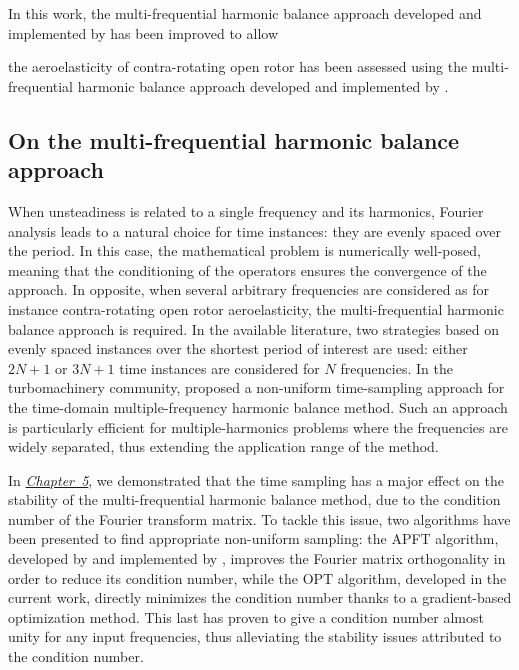 In this work, the multi-frequential
harmonic balance approach developed and implemented 
by \citet{ThesisGuedeney} has been improved
to allow

the aeroelasticity of 
contra-rotating open rotor has been assessed 
using the multi-frequential
harmonic balance approach developed and implemented 
by \citet{ThesisGuedeney}.

\subsection*{On the multi-frequential harmonic balance approach}

When unsteadiness is related to a single frequency and its
harmonics, Fourier analysis leads to a natural choice for time instances:
they are evenly spaced over the period. In this case, the mathematical
problem is numerically well-posed, meaning that the conditioning of
the operators ensures the convergence of the approach.
In opposite, when several arbitrary frequencies are 
considered as for instance contra-rotating open rotor
aeroelasticity, the multi-frequential harmonic balance approach
is required. In the available literature, two strategies based on evenly
spaced instances over the shortest period of interest are used: either
$2N+1$ or $3N+1$ time instances are considered for $N$ frequencies.
In the turbomachinery community, \citet{ThesisGuedeney} 
proposed a non-uniform time-sampling approach for
the time-domain multiple-frequency harmonic balance method. Such an
approach is particularly efficient for multiple-harmonics problems where
the frequencies are widely separated, thus extending the application range
of the method. 

In \hyperref[cha:limitations_condition_number]{\emph{Chapter~5}},
we demonstrated that the time sampling has a major effect on the
stability of the multi-frequential harmonic balance 
method, due to the condition number of the Fourier
transform matrix. To tackle this issue, two algorithms have been presented to
find appropriate non-uniform sampling: the APFT algorithm, developed
by \citet{Kundert1988} and implemented by \citet{ThesisGuedeney}, improves the
Fourier matrix orthogonality in order to reduce its condition number, while
the OPT algorithm, developed in the current work, 
directly minimizes the condition number thanks to a
gradient-based optimization method. This last has proven to
give a condition number almost unity for any input frequencies,
thus alleviating the stability issues attributed to 
the condition number.

